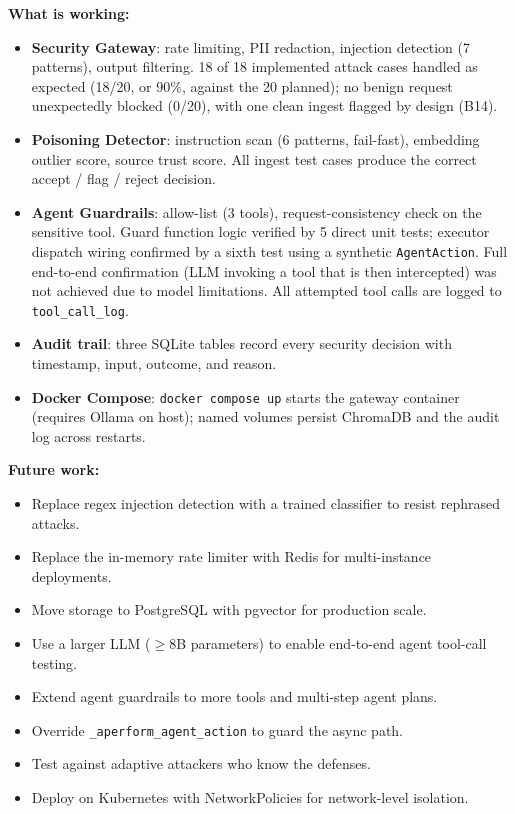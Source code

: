 \documentclass[11pt,a4paper]{article}
\begin{document}
\textbf{What is working:}
\begin{itemize}[noitemsep]
  \item \textbf{Security Gateway}: rate limiting, PII redaction, injection
        detection (7 patterns), output filtering. 18 of 18 implemented attack
        cases handled as expected (18/20, or 90\%, against the 20 planned);
        no benign request unexpectedly blocked (0/20), with one clean ingest
        flagged by design (B14).
  \item \textbf{Poisoning Detector}: instruction scan (6 patterns, fail-fast),
        embedding outlier score, source trust score. All ingest test cases
        produce the correct accept / flag / reject decision.
  \item \textbf{Agent Guardrails}: allow-list (3 tools), request-consistency
        check on the sensitive tool. Guard function logic verified by 5 direct
        unit tests; executor dispatch wiring confirmed by a sixth test using a
        synthetic \texttt{AgentAction}. Full end-to-end confirmation (LLM
        invoking a tool that is then intercepted) was not achieved due to model
        limitations. All attempted tool calls are logged to
        \texttt{tool\_call\_log}.
  \item \textbf{Audit trail}: three SQLite tables record every security
        decision with timestamp, input, outcome, and reason.
  \item \textbf{Docker Compose}: \texttt{docker compose up} starts the gateway
        container (requires Ollama on host); named volumes persist ChromaDB
        and the audit log across restarts.
\end{itemize}

\textbf{Future work:}
\begin{itemize}[noitemsep]
  \item Replace regex injection detection with a trained classifier to resist
        rephrased attacks.
  \item Replace the in-memory rate limiter with Redis for multi-instance
        deployments.
  \item Move storage to PostgreSQL with pgvector for production scale.
  \item Use a larger LLM ($\geq$8B parameters) to enable end-to-end agent
        tool-call testing.
  \item Extend agent guardrails to more tools and multi-step agent plans.
  \item Override \texttt{\_aperform\_agent\_action} to guard the async path.
  \item Test against adaptive attackers who know the defenses.
  \item Deploy on Kubernetes with NetworkPolicies for network-level isolation.
\end{itemize}
\end{document}
